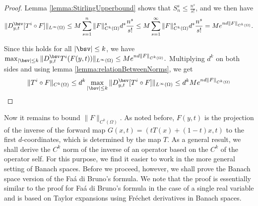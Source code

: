 \begin{proof}
Lemma \ref{lemma:StirlingUpperbound} shows that $S_n^s \leq \frac{n^s}{s!}$, and we then have $$\|D^\bsv_{y,t}[T^i\circ F]\|_{L^\infty(\Omega)} \leq M\sum_{s=1}^n \|F\|_{C^k(\Omega)}^{s}d^s\frac{n^s}{s!} \leq M\sum_{s=1}^\infty \|F\|_{C^k(\Omega)}^{s}d^s\frac{n^s}{s!} = Me^{nd\|F\|_{C^k(\Omega)}}.$$

Since this holds for all $|\bsv| \leq k$, we have $\max_{|\bsv|\leq k} \|D^\bsv_{y,t}T^i(F(y,t))\|_{L^\infty(\Omega)} \leq Me^{nd\|F\|_{C^k(\Omega)}}.$ Multiplying $d^k$ on both sides and using lemma \ref{lemma:relationBetweenNorms}, we get 
$$\|T^i\circ F\|_{C^k(\Omega)} \leq d^k\max_{|\bsv|\leq k} \|D^\bsv_{y,t}[T^i\circ F]\|_{L^\infty(\Omega)} \leq d^kMe^{nd\|F\|_{C^k(\Omega)}} $$
\end{proof}

Now it remains to bound $\|F\|_{C^k(\Omega)}$. As noted before, $F(y,t)$ is the projection of the inverse of the forward map $G(x,t) = (tT(x) + (1-t)x, t)$ to the first $d$-coordinates, which is determined by the map $T$. As a general result, we shall derive the $C^k$ norm of the inverse of an operator based on the $C^k$ of the operator self. For this purpose, we find it easier to work in the more general setting of Banach spaces. Before we proceed, however, we shall prove the Banach space version of the Fa\'{a} di Bruno's formula. We note that the proof is essentially similar to the proof for Fa\'{a} di Bruno's formula in the case of a single real variable and is based on Taylor expansions using Fr\'echet derivatives in Banach spaces.     

